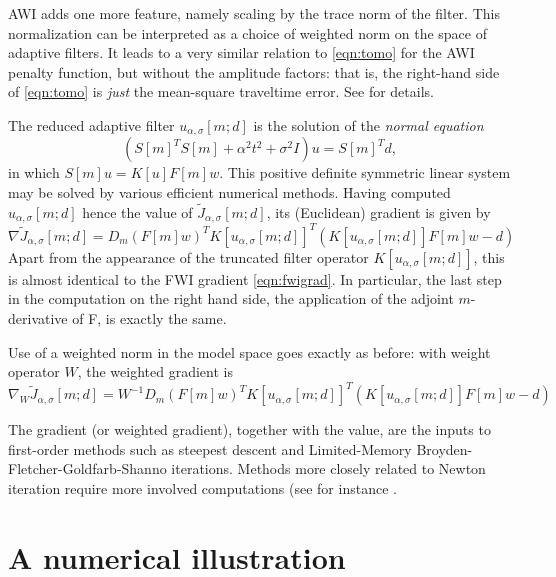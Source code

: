 AWI adds one more feature, namely scaling by the trace norm of the
filter. This normalization can be interpreted as a choice of weighted
norm on the space of adaptive filters. It leads to a very similar
relation to \ref{eqn:tomo} for the AWI penalty function, but without
the amplitude factors: that is, the right-hand side of \ref{eqn:tomo}
is {\em just} the mean-square traveltime error. See \cite{Symes:24a}
for details.
    
The reduced adaptive filter $u_{\alpha,\sigma}[m;d]$ is the solution
of the {\em normal equation}
\begin{equation}
  \label{eqn:normal}
  (S[m]^TS[m] + \alpha^2 t^2 + \sigma^2 I)u = S[m]^Td,
\end{equation}
in which $S[m]u = K[u]F[m]w$. This positive definite symmetric linear
system may be solved by various efficient numerical methods. Having
computed $u_{\alpha,\sigma}[m;d]$ hence the value of 
$\tilde{J}_{\alpha,\sigma}[m;d]$, its (Euclidean) gradient is given by
\begin{equation}
  \label{eqn:gradredfiltpen}
  \nabla \tilde{J}_{\alpha,\sigma}[m;d] =
  D_m(F[m]w)^TK[u_{\alpha,\sigma}[m;d]]^T(K[u_{\alpha,\sigma}[m;d]]F[m]w-d)
\end{equation}
Apart from the appearance of the truncated filter operator
$K[u_{\alpha,\sigma}[m;d]]$, this is almost identical to the FWI
gradient \ref{eqn:fwigrad}. In particular, the last step in the
computation on the right hand side, the application of the adjoint
$m$-derivative of F, is exactly the same.

Use of a weighted norm in the model space goes exactly as before: with
weight operator $W$, the weighted gradient is
\begin{equation}
  \label{eqn:wgradredfiltpen}
  \nabla_W \tilde{J}_{\alpha,\sigma}[m;d] =
  W^{-1}D_m(F[m]w)^TK[u_{\alpha,\sigma}[m;d]]^T(K[u_{\alpha,\sigma}[m;d]]F[m]w-d)
\end{equation}

The gradient (or weighted gradient), together with the value, are the
inputs to first-order methods such as steepest descent and
Limited-Memory Broyden-Fletcher-Goldfarb-Shanno
iterations. Methods more closely related to Newton iteration require
more involved computations (see for instance \cite{Kaufman:75}. 

\section{A numerical illustration}

